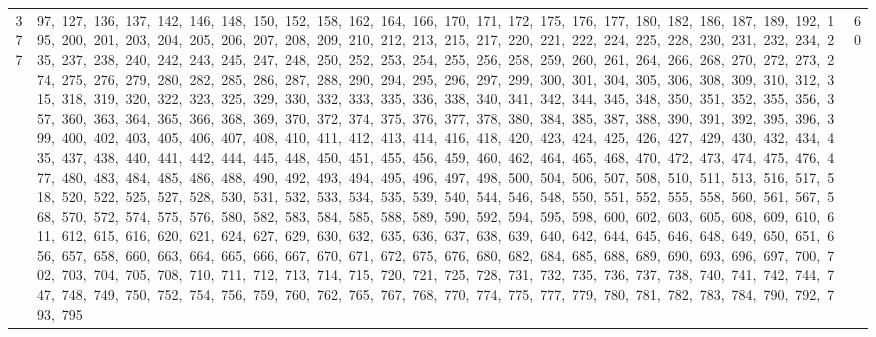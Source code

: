 \begin{longtable}{c|p{}|r}
377 & 97,\ 127,\ 136,\ 137,\ 142,\ 146,\ 148,\ 150,\ 152,\ 158,\ 162,\ 164,\ 166,\ 170,\ 171,\ 172,\ 175,\ 176,\ 177,\ 180,\ 182,\ 186,\ 187,\ 189,\ 192,\ 195,\ 200,\ 201,\ 203,\ 204,\ 205,\ 206,\ 207,\ 208,\ 209,\ 210,\ 212,\ 213,\ 215,\ 217,\ 220,\ 221,\ 222,\ 224,\ 225,\ 228,\ 230,\ 231,\ 232,\ 234,\ 235,\ 237,\ 238,\ 240,\ 242,\ 243,\ 245,\ 247,\ 248,\ 250,\ 252,\ 253,\ 254,\ 255,\ 256,\ 258,\ 259,\ 260,\ 261,\ 264,\ 266,\ 268,\ 270,\ 272,\ 273,\ 274,\ 275,\ 276,\ 279,\ 280,\ 282,\ 285,\ 286,\ 287,\ 288,\ 290,\ 294,\ 295,\ 296,\ 297,\ 299,\ 300,\ 301,\ 304,\ 305,\ 306,\ 308,\ 309,\ 310,\ 312,\ 315,\ 318,\ 319,\ 320,\ 322,\ 323,\ 325,\ 329,\ 330,\ 332,\ 333,\ 335,\ 336,\ 338,\ 340,\ 341,\ 342,\ 344,\ 345,\ 348,\ 350,\ 351,\ 352,\ 355,\ 356,\ 357,\ 360,\ 363,\ 364,\ 365,\ 366,\ 368,\ 369,\ 370,\ 372,\ 374,\ 375,\ 376,\ 377,\ 378,\ 380,\ 384,\ 385,\ 387,\ 388,\ 390,\ 391,\ 392,\ 395,\ 396,\ 399,\ 400,\ 402,\ 403,\ 405,\ 406,\ 407,\ 408,\ 410,\ 411,\ 412,\ 413,\ 414,\ 416,\ 418,\ 420,\ 423,\ 424,\ 425,\ 426,\ 427,\ 429,\ 430,\ 432,\ 434,\ 435,\ 437,\ 438,\ 440,\ 441,\ 442,\ 444,\ 445,\ 448,\ 450,\ 451,\ 455,\ 456,\ 459,\ 460,\ 462,\ 464,\ 465,\ 468,\ 470,\ 472,\ 473,\ 474,\ 475,\ 476,\ 477,\ 480,\ 483,\ 484,\ 485,\ 486,\ 488,\ 490,\ 492,\ 493,\ 494,\ 495,\ 496,\ 497,\ 498,\ 500,\ 504,\ 506,\ 507,\ 508,\ 510,\ 511,\ 513,\ 516,\ 517,\ 518,\ 520,\ 522,\ 525,\ 527,\ 528,\ 530,\ 531,\ 532,\ 533,\ 534,\ 535,\ 539,\ 540,\ 544,\ 546,\ 548,\ 550,\ 551,\ 552,\ 555,\ 558,\ 560,\ 561,\ 567,\ 568,\ 570,\ 572,\ 574,\ 575,\ 576,\ 580,\ 582,\ 583,\ 584,\ 585,\ 588,\ 589,\ 590,\ 592,\ 594,\ 595,\ 598,\ 600,\ 602,\ 603,\ 605,\ 608,\ 609,\ 610,\ 611,\ 612,\ 615,\ 616,\ 620,\ 621,\ 624,\ 627,\ 629,\ 630,\ 632,\ 635,\ 636,\ 637,\ 638,\ 639,\ 640,\ 642,\ 644,\ 645,\ 646,\ 648,\ 649,\ 650,\ 651,\ 656,\ 657,\ 658,\ 660,\ 663,\ 664,\ 665,\ 666,\ 667,\ 670,\ 671,\ 672,\ 675,\ 676,\ 680,\ 682,\ 684,\ 685,\ 688,\ 689,\ 690,\ 693,\ 696,\ 697,\ 700,\ 702,\ 703,\ 704,\ 705,\ 708,\ 710,\ 711,\ 712,\ 713,\ 714,\ 715,\ 720,\ 721,\ 725,\ 728,\ 731,\ 732,\ 735,\ 736,\ 737,\ 738,\ 740,\ 741,\ 742,\ 744,\ 747,\ 748,\ 749,\ 750,\ 752,\ 754,\ 756,\ 759,\ 760,\ 762,\ 765,\ 767,\ 768,\ 770,\ 774,\ 775,\ 777,\ 779,\ 780,\ 781,\ 782,\ 783,\ 784,\ 790,\ 792,\ 793,\ 795 & 60 \\

\end{longtable}
